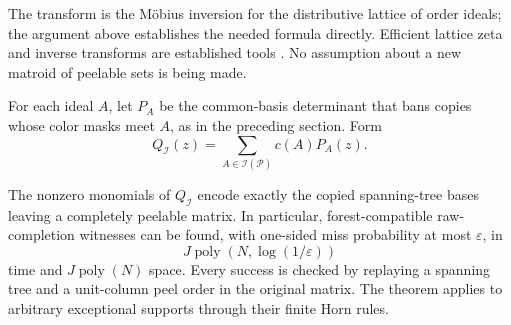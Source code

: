 The transform is the M\"obius inversion for the distributive lattice of
order ideals; the argument above establishes the needed formula directly.
Efficient lattice zeta and inverse transforms are established tools
\cite{FastZeta2012,KaskiKohonenWesterback2016}.
No assumption about a new matroid of peelable sets is being made.

For each ideal $A$, let $P_A$ be the common-basis determinant that bans
copies whose color masks meet $A$, as in the preceding section.  Form
\begin{equation}\label{eq:ideal-filter}
                   Q_{\mathcal I}(z)
                       =\sum_{A\in\mathcal I(\mathcal P)}c(A)P_A(z).
\end{equation}

\begin{theorem}\label{thm:ideal-sieve}
The nonzero monomials of $Q_{\mathcal I}$ encode exactly the copied
spanning-tree bases leaving a completely peelable matrix.  In particular,
forest-compatible raw-completion witnesses can be found, with one-sided
miss probability at most $\varepsilon$, in
\begin{equation}\label{eq:ideal-time}
                     J\operatorname{poly}(N,\log(1/\varepsilon))
\end{equation}
time and $J\operatorname{poly}(N)$ space.  Every success is checked by
replaying a spanning tree and a unit-column peel order in the original
matrix.  The theorem applies to arbitrary exceptional supports through
their finite Horn rules.
\end{theorem}
